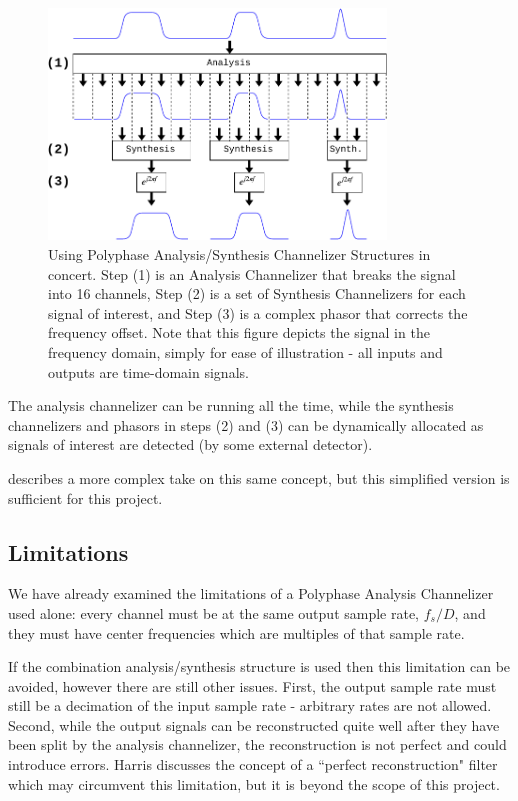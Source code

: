 \documentclass[12pt]{article}
\begin{document}
\begin{figure}[h!]
    \begin{center}
    \includegraphics[width=0.8\textwidth]{polyphase}%
    \end{center}
    \caption{
Using Polyphase Analysis/Synthesis Channelizer Structures in concert. Step (1)
is an Analysis Channelizer that breaks the signal into 16 channels, Step (2) is
a set of Synthesis Channelizers for each signal of interest, and Step (3) is
a complex phasor that corrects the frequency offset. Note that this figure
depicts the signal in the frequency domain, simply for ease of illustration -
all inputs and outputs are time-domain signals.
    }
    \label{fig:analysis_and_synthesis}
\end{figure}

The analysis channelizer can be running all the time, while the synthesis
channelizers and phasors in steps (2) and (3) can be dynamically allocated as
signals of interest are detected (by some external detector).

\cite{Harris2} describes a more complex take on this same concept, but this
simplified version is sufficient for this project.



\subsection{Limitations}
\label{sec:poly_limitations}
We have already examined the limitations of a Polyphase Analysis
Channelizer used alone: every channel must be at the same output sample
rate, $f_s/D$, and they must have center frequencies which are multiples of
that sample rate.

If the combination analysis/synthesis structure is used then this limitation
can be avoided, however there are still other issues. First, the output sample
rate must still be a decimation of the input sample rate - arbitrary rates are
not allowed. Second, while the output signals can be reconstructed quite well
after they have been split by the analysis channelizer, the reconstruction is
not perfect and could introduce errors. Harris discusses the concept of
a ``perfect reconstruction" filter \cite{Harris2} which may circumvent this
limitation, but it is beyond the scope of this project.
\end{document}
